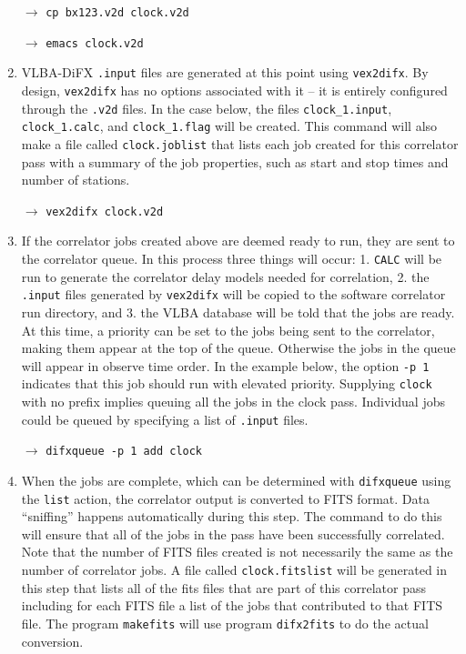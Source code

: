 \begin{enumerate}
$\longrightarrow$ {\tt cp bx123.v2d clock.v2d}

$\longrightarrow$ {\tt emacs clock.v2d}

\item
VLBA-DiFX {\tt .input} files are generated at this point using {\tt vex2difx}.
By design, {\tt vex2difx} has no options associated with it -- it is entirely configured through the {\tt .v2d} files.
In the case below, the files {\tt clock\_1.input}, {\tt clock\_1.calc}, and {\tt clock\_1.flag} will be created.
This command will also make a file called {\tt clock.joblist} that lists each job created for this correlator pass with a summary of the job properties, such as start and stop times and number of stations.

$\longrightarrow$ {\tt vex2difx clock.v2d}

\item
If the correlator jobs created above are deemed ready to run, they are sent to the correlator queue.
In this process three things will occur: 1. {\tt CALC} will be run to generate the correlator delay models needed for correlation, 2. the {\tt .input} files generated by {\tt vex2difx} will be copied to the software correlator run directory, and 3. the VLBA database will be told that the jobs are ready.
At this time, a priority can be set to the jobs being sent to the correlator, making them appear at the top of the queue.
Otherwise the jobs in the queue will appear in observe time order.
In the example below, the option {\tt -p 1} indicates that this job should run with elevated priority.
Supplying {\tt clock} with no prefix implies queuing all the jobs in the clock pass.
Individual jobs could be queued by specifying a list of {\tt .input} files.

$\longrightarrow$ {\tt difxqueue -p 1 add clock}

\item
When the jobs are complete, which can be determined with {\tt difxqueue} using the {\tt list} action, the correlator output is converted to FITS format.
Data ``sniffing'' happens automatically during this step.
The command to do this will ensure that all of the jobs in the pass have been successfully correlated.
Note that the number of FITS files created is not necessarily the same as the number of correlator jobs.
A file called {\tt clock.fitslist} will be generated in this step that lists all of the fits files that are part of this correlator pass including for each FITS file a list of the jobs that contributed to that FITS file. 
The program {\tt makefits} will use program {\tt difx2fits} to do the actual conversion.



\end{enumerate}
